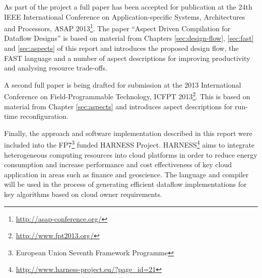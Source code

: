 As part of the project a full paper has been accepted for publication
at the 24th IEEE International Conference on Application-specific
Systems, Architectures and Processors, ASAP
2013\footnote{\url{http://asap-conference.org/}}.  The paper ``Aspect
Driven Compilation for Dataflow Designs'' \cite{pgrig} is based on
material from Chapters \ref{sec:design-flow}, \ref{sec:fast} and
\ref{sec:aspects} of this report and introduces the proposed design
flow, the FAST language and a number of aspect descriptions for
improving productivity and analysing resource trade-offs.

A second full paper is being drafted for submission at the 2013
International Conference on Field-Programmable Technology, ICFPT
2013\footnote{\url{http://www.fpt2013.org/}}. This is based on material
from Chapter \ref{sec:aspects} and introduces aspect descriptions for
run-time reconfiguration.

Finally, the approach and software implementation described in this
report were included into the FP7\footnote{European Union Seventh
  Framework Programme} funded HARNESS Project.
HARNESS\footnote{\url{http://www.harness-project.eu/?page_id=21}} aims
to integrate heterogeneous computing resources into cloud platforms in
order to reduce energy consumption and increase performance and cost
effectiveness of key cloud application in areas such as finance and
geoscience. The \FAST{} language and \fastc{} compiler will be used in
the process of generating efficient dataflow implementations for key
algorithms based on cloud owner requirements.

